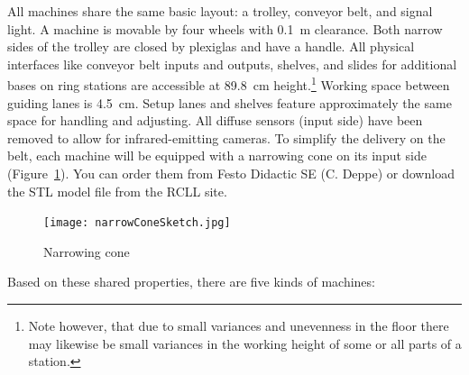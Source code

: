 \documentclass[12pt,twoside]{article}
\newcommand{\reffig}[1]{Figure~\ref{#1}}
\begin{document}
All machines share the same basic layout: a trolley, conveyor belt,
and signal light. A machine is movable by four wheels with
\SI{0.1}{\metre} clearance. Both narrow sides of the trolley are
closed by plexiglas and have a handle. All physical interfaces like
conveyor belt inputs and outputs, shelves, and slides for additional
bases on ring stations are accessible at \SI{89.8}{\centi\metre}
height.\footnote{Note however, that due to small variances and
  unevenness in the floor there may likewise be small variances in the
  working height of some or all parts of a station.} Working space
between guiding lanes is \SI{4.5}{\centi\metre}. Setup lanes and
shelves feature approximately the same space for handling and
adjusting. All diffuse sensors (input side) have been removed to allow
for infrared-emitting cameras.  To simplify the delivery on the belt,
each machine will be equipped with a narrowing cone on its input side
(\reffig{fig:narrow-cone}).  You can order them from Festo Didactic SE
(C. Deppe) or download the STL model file from the RCLL site.
\begin{figure}
    \texttt{[image: narrowConeSketch.jpg]}
\caption{Narrowing cone}
\label{fig:narrow-cone}
\end{figure}
%
Based on these shared properties, there are five kinds of machines:
\end{document}
